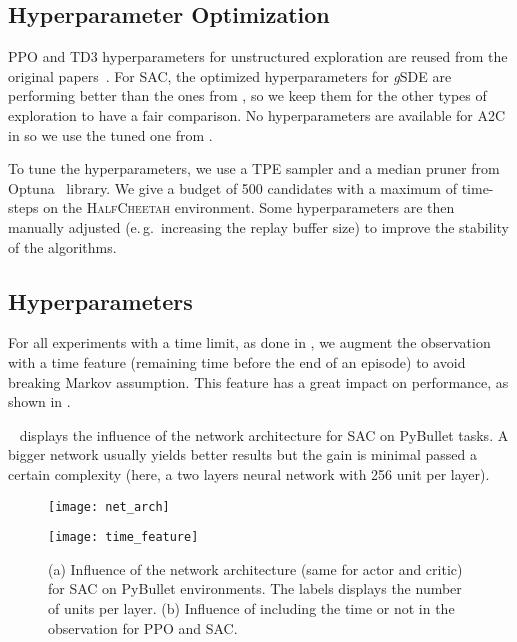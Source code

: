 \documentclass{article}
\newcommand{\eg}{e.\,g.\ }
\newcommand{\ourSDE}{\textit{g}\textsc{SDE}\xspace}
\newcommand{\aac}{\textsc{A2C}\xspace}
\newcommand{\ppo}{\textsc{PPO}\xspace}
\newcommand{\sac}{\textsc{SAC}\xspace}
\newcommand{\tddd}{\textsc{TD3}\xspace}
\newcommand{\hc}{\textsc{HalfCheetah}\xspace}
\begin{document}
\subsection{Hyperparameter Optimization}
\label{sec:optim}

\ppo and \tddd hyperparameters for unstructured exploration are reused from the original papers~\citep{schulman2017proximal, fujimoto2018addressing}.
For \sac, the optimized hyperparameters for \ourSDE are performing better than the ones from \citet{haarnoja2018soft}, so we keep them for the other types of exploration to have a fair comparison.
No hyperparameters are available for \aac in \citet{mnih2016asynchronous} so we use the tuned one from \citet{raffin2018zoo}.

To tune the hyperparameters, we use a TPE sampler and a median pruner from Optuna~\citep{akiba2019optuna} library.
We give a budget of 500 candidates with a maximum of  time-steps on the \hc environment. Some hyperparameters are then manually adjusted (\eg increasing the replay buffer size) to improve the stability of the algorithms.


\subsection{Hyperparameters}
\label{sec:hyperparameters}

For all experiments with a time limit, as done in \citep{duan2016benchmarking, pardo2017time, rajeswaran2017towards, hill2018stable}, we augment the observation with a time feature (remaining time before the end of an episode) to avoid breaking Markov assumption. This feature has a great impact on performance, as shown in .

~ displays the influence of the network architecture for \sac on PyBullet tasks. A bigger network usually yields better results but the gain is minimal passed a certain complexity (here, a two layers neural network with 256 unit per layer).

\begin{figure}[h]
  \begin{minipage}[t]{.5\linewidth}
    \centering\texttt{[image: net\_arch]}
    \label{fig:net-arch}
  \end{minipage}
  \begin{minipage}[t]{.5\linewidth}
    \centering\texttt{[image: time\_feature]}
    \label{fig:time-wrapper}
  \end{minipage}
  \caption{(a) Influence of the network architecture (same for actor and critic) for \sac on PyBullet environments. The labels displays the number of units per layer. (b) Influence of including the time or not in the observation for \ppo and \sac.}
\end{figure}
\end{document}
